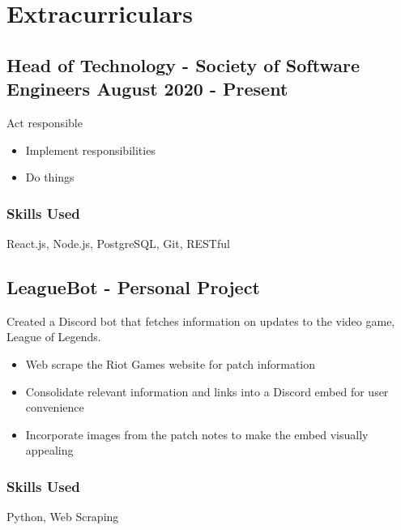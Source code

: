 \documentclass[11pt, letterpaper]{article}
\begin{document}
    \section{Extracurriculars}
        \subsection{Head of Technology - Society of Software Engineers \hfill August 2020 - Present}
            Act responsible 
            \begin{itemize}[nosep]
                \item Implement responsibilities
                \item Do things
            \end{itemize}
            \subsubsection{Skills Used}
                React.js, Node.js, PostgreSQL, Git, RESTful
        \subsection{LeagueBot - Personal Project}
            Created a Discord bot that fetches information on updates to the video game, League 
            of Legends.
            \begin{itemize}[nosep]
                \item Web scrape the Riot Games website for patch information
                \item Consolidate relevant information and links into a Discord embed for user convenience
                \item Incorporate images from the patch notes to make the embed visually appealing
            \end{itemize}
            \subsubsection{Skills Used}
                Python, Web Scraping
\end{document}
